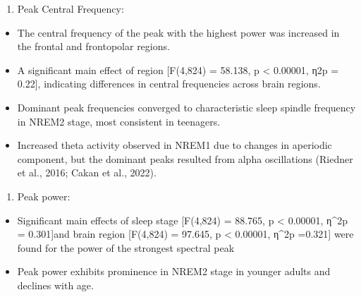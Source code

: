 \documentclass[letterpaper,10pt,english]{sphinxmanual}
\begin{document}

\sphinxAtStartPar
{}
\begin{enumerate}
%
\setcounter{enumi}{2}
\item {} 
\sphinxAtStartPar
Peak Central Frequency:

\end{enumerate}
\begin{itemize}
\item {} 
\sphinxAtStartPar
The central frequency of the peak with the highest power was increased in the frontal and frontopolar regions.

\item {} 
\sphinxAtStartPar
A significant main effect of region {[}F(4,824) = 58.138, p \textless{} 0.00001, η2p = 0.22{]}, indicating differences in central frequencies across brain regions.

\item {} 
\sphinxAtStartPar
Dominant peak frequencies converged to characteristic sleep spindle frequency in NREM2 stage, most consistent in teenagers.

\item {} 
\sphinxAtStartPar
Increased theta activity observed in NREM1 due to changes in aperiodic component, but the dominant peaks resulted from alpha oscillations (Riedner et al., 2016; Cakan et al., 2022).

\end{itemize}


\sphinxAtStartPar
{}
\begin{enumerate}
%
\setcounter{enumi}{3}
\item {} 
\sphinxAtStartPar
Peak power:

\end{enumerate}
\begin{itemize}
\item {} 
\sphinxAtStartPar
Significant main effects of sleep stage {[}F(4,824) = 88.765, p \textless{} 0.00001, η\textasciicircum{}2p = 0.301{]}and brain region {[}F(4,824) = 97.645, p \textless{} 0.00001, η\textasciicircum{}2p =0.321{]} were found for the power of the strongest spectral peak

\item {} 
\sphinxAtStartPar
Peak power exhibits prominence in NREM2 stage in younger adults and declines with age.

\end{itemize}
\end{document}
